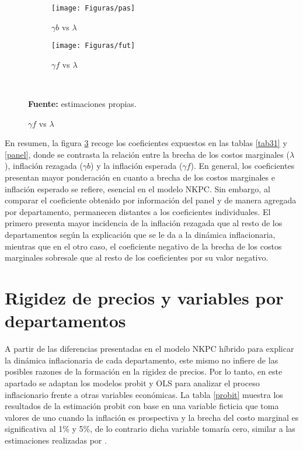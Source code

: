 \begin{figure}[H]
\caption{Resultados de las estimaciones en $\gamma{b}$, $\gamma{f}$ y $\lambda$}
\begin{subfigure}{0.48\textwidth}
  \centering
	\texttt{[image: Figuras/pas]} 
  \caption{$\gamma{b}$ vs $\lambda$}
  \label{}
\end{subfigure}
\begin{subfigure}{0.48\textwidth}
  \centering
	\texttt{[image: Figuras/fut]} 
  \caption{$\gamma{f}$ vs $\lambda$}
  \label{}
\end{subfigure}
	\label{grap}\\
  \raggedright  \scriptsize \textbf{Fuente:} estimaciones propias.
\end{figure}	

En resumen, la figura \ref{grap} recoge los coeficientes expuestos en las tablas \ref{tab31} y \ref{panel}, donde se contrasta la relación entre  la brecha de los costos marginales ($\lambda$), inflación rezagada ($\gamma{b}$) y la inflación esperada ($\gamma{f}$). En general, los coeficientes presentan mayor ponderación en cuanto a brecha de los costos marginales e inflación esperado se refiere, esencial en el modelo NKPC. Sin embargo, al comparar el coeficiente obtenido por información del panel y de manera agregada por departamento, permanecen distantes a los coeficientes individuales. El primero presenta mayor incidencia de la inflación rezagada que al resto de los departamentos según la explicación que se le da a la dinámica inflacionaria, mientras que en el otro caso, el  coeficiente negativo de la brecha de los costos marginales sobresale que al resto de los coeficientes por su valor negativo. 

\section{Rigidez de precios y variables por departamentos}
A partir de las diferencias presentadas en el modelo NKPC híbrido para explicar  la dinámica inflacionaria de cada departamento, este mismo no infiere de las posibles razones de la formación en la rigidez de precios. Por lo tanto, en este apartado se adaptan los modelos probit  y OLS para analizar el proceso inflacionario frente a otras variables económicas. La tabla \ref{probit} muestra los resultados de la estimación probit con base en una variable ficticia que toma valores de uno cuando la inflación es prospectiva y la brecha del costo marginal es significativa al 1\% y 5\%, de lo contrario dicha variable tomaría cero,  similar a las estimaciones realizadas por \cite{mehrotra2010modelling}.

